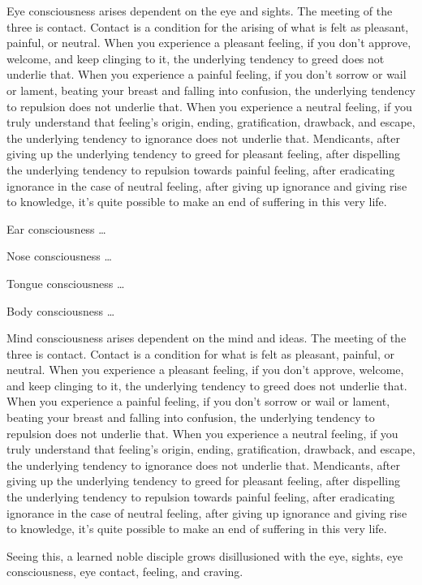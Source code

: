 \documentclass[12pt,openany]{book}%
\begin{document}
Eye consciousness arises dependent on the eye and sights. The meeting of the three is contact. Contact is a condition for the arising of what is felt as pleasant, painful, or neutral. When you experience a pleasant feeling, if you don’t approve, welcome, and keep clinging to it, the underlying tendency to greed does not underlie that. When you experience a painful feeling, if you don’t sorrow or wail or lament, beating your breast and falling into confusion, the underlying tendency to repulsion does not underlie that. When you experience a neutral feeling, if you truly understand that feeling’s origin, ending, gratification, drawback, and escape, the underlying tendency to ignorance does not underlie that. Mendicants, after giving up the underlying tendency to greed for pleasant feeling, after dispelling the underlying tendency to repulsion towards painful feeling, after eradicating ignorance in the case of neutral feeling, after giving up ignorance and giving rise to knowledge, it’s quite possible to make an end of suffering in this very life. 

Ear consciousness … 

Nose consciousness … 

Tongue consciousness … 

Body consciousness … 

Mind consciousness arises dependent on the mind and ideas. The meeting of the three is contact. Contact is a condition for what is felt as pleasant, painful, or neutral. When you experience a pleasant feeling, if you don’t approve, welcome, and keep clinging to it, the underlying tendency to greed does not underlie that. When you experience a painful feeling, if you don’t sorrow or wail or lament, beating your breast and falling into confusion, the underlying tendency to repulsion does not underlie that. When you experience a neutral feeling, if you truly understand that feeling’s origin, ending, gratification, drawback, and escape, the underlying tendency to ignorance does not underlie that. Mendicants, after giving up the underlying tendency to greed for pleasant feeling, after dispelling the underlying tendency to repulsion towards painful feeling, after eradicating ignorance in the case of neutral feeling, after giving up ignorance and giving rise to knowledge, it’s quite possible to make an end of suffering in this very life. 

Seeing this, a learned noble disciple grows disillusioned with the eye, sights, eye consciousness, eye contact, feeling, and craving. 
\end{document}
